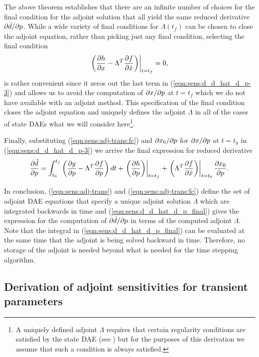 \documentclass[pdf,ps2pdf,11pt]{SANDreport}
\begin{document}
The above theorem establishes that there are an infinite number of choices for
the final condition for the adjoint solution that all yield the same reduced
derivative $\partial \hat{d} / \partial p$.  While a wide variety of final conditions for
$\Lambda(t_f)$ can be chosen to close the adjoint equation, rather than
picking just any final condition, selecting the final condition
%
\begin{equation}
\left. \left(
  \displaystyle{\frac{\partial h}{\partial x}} - \Lambda^T \displaystyle{\frac{\partial f}{\partial \dot{x}}}
\right) \right|_{t=t_f}
 = 0,
\label{eqn:sens:adj-trans:fc}
\end{equation}
%
is rather convenient since it zeros out the last term in
(\ref{eqn:sens:d_d_hat_d_p-3}) and allows us to avoid the computation of
$\partial x / \partial p$ at $t=t_f$ which we do not have available with an adjoint method.
This specification of the final condition closes the adjoint equation and
uniquely defines the adjoint $\Lambda$ in all of the cases of state DAEs what
we will consider here\footnote{A uniquely defined adjoint $\Lambda$ requires
that certain regularity conditions are satisfied by the state DAE (see
{}\cite{adjoint-sens-2003}) but for the purposes of this derivation we assume
that such a condition is always satisfied.}.

Finally, substituting (\ref{eqn:sens:adj-trans:fc}) and
$\partial x_0 / \partial p$ for $\partial x / \partial p$ at $t=t_0$ in
(\ref{eqn:sens:d_d_hat_d_p-3}) we arrive the final expression for
reduced derivative
%
\begin{equation}
\displaystyle{\frac{\partial \hat{d}}{\partial p}} =
\int_{t_0}^{t_f} \left(
    \displaystyle{\frac{\partial g}{\partial p}}
    - \Lambda^T \displaystyle{\frac{\partial f}{\partial p}}
  \right) dt
  + \left. \left( \displaystyle{\frac{\partial h}{\partial p}} \right) \right|_{t=t_f}
  + \left. \left( \Lambda^T \displaystyle{\frac{\partial f}{\partial \dot{x}}} \right) \right|_{t=t_0} \displaystyle{\frac{\partial x_0}{\partial p}}.
\label{eqn:sens:d_d_hat_d_p_final}
\end{equation}

In conclusion, (\ref{eqn:sens:adj-trans}) and (\ref{eqn:sens:adj-trans:fc})
define the set of adjoint DAE equations that specify a unique adjoint solution
$\Lambda$ which are integrated backwards in time and
(\ref{eqn:sens:d_d_hat_d_p_final}) gives the expression for the computation of
$\partial \hat{d} / \partial p$ in terms of the computed adjoint $\Lambda$.  Note that the
integral in (\ref{eqn:sens:d_d_hat_d_p_final}) can be evaluated at the same
time that the adjoint is being solved backward in time.  Therefore, no storage
of the adjoint is needed beyond what is needed for the time stepping
algorithm.

\subsection{Derivation of adjoint sensitivities for transient parameters}
\end{document}
